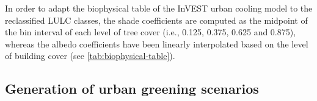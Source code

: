 \documentclass[10pt,letterpaper]{article}
\begin{document}
In order to adapt the biophysical table of the InVEST urban cooling model to the reclassified LULC classes, the shade coefficients are computed as the midpoint of the bin interval of each level of tree cover (i.e., 0.125, 0.375, 0.625 and 0.875), whereas the albedo coefficients have been linearly interpolated based on the level of building cover (see \autoref{tab:biophysical-table}).









\subsection*{Generation of urban greening scenarios}
\end{document}
